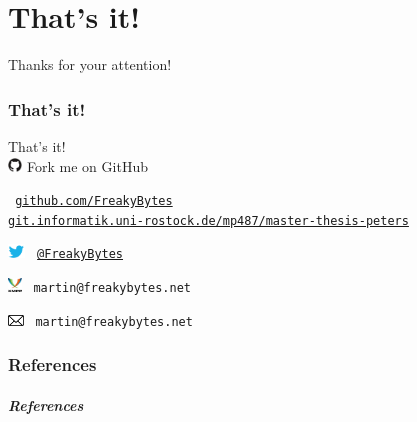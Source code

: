 \part{That's it!}
\label{part:end}

\begin{frame}[c]
	\centering
	\LARGE Thanks for your attention!
\end{frame}

\section*{That's it!}
\begin{frame}[c]
	{\LARGE That's it!}\\
	
	\includegraphics[height=1em]{res/github.pdf}
	\hspace{6.3mm} Fork me on GitHub
	
	{\small \tt
	\textcolor{colorscheme}{\href{https://github.com/FreakyBytes}{github.com/FreakyBytes}}\\
	\textcolor{colorscheme}{\href{https://git.informatik.uni-rostock.de/mp487/master-thesis-peters}{git.informatik.uni-rostock.de/mp487/master-thesis-peters}}
	}
	
	\vspace{1.5em}
	
	\includegraphics[height=1em]{res/twitter.png}
	\hspace{3.5mm} \textcolor{colorscheme}{\tt\  \href{https://twitter.com/FreakyBytes}{@FreakyBytes}}
	
	\includegraphics[height=1em]{res/XMPP_logo.pdf}
	\hspace{5mm} \textcolor{colorscheme}{\tt\  martin@freakybytes.net}
	
	\includegraphics[height=0.8em]{res/mail.pdf}
	\hspace{4.45mm} \textcolor{colorscheme}{\tt\  martin@freakybytes.net}
		
\end{frame}

\section{References}
\begin{frame}[t,shrink=40]
	\frametitle{References}
	
	\printbibliography
\end{frame}